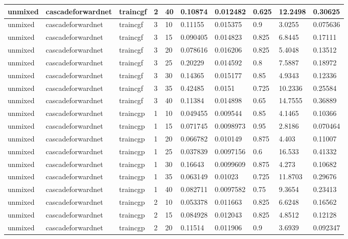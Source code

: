 \begin{longtable}{lllllllll}
unmixed & cascadeforwardnet & traincgf & 2 & 40 & 0.10874 & 0.012482 & 0.625 & 12.2498 & 0.30625 \\ \hline 
unmixed & cascadeforwardnet & traincgf & 3 & 10 & 0.11155 & 0.015375 & 0.9 & 3.0255 & 0.075636 \\ \hline 
unmixed & cascadeforwardnet & traincgf & 3 & 15 & 0.090405 & 0.014823 & 0.825 & 6.8445 & 0.17111 \\ \hline 
unmixed & cascadeforwardnet & traincgf & 3 & 20 & 0.078616 & 0.016206 & 0.825 & 5.4048 & 0.13512 \\ \hline 
unmixed & cascadeforwardnet & traincgf & 3 & 25 & 0.20229 & 0.014592 & 0.8 & 7.5887 & 0.18972 \\ \hline 
unmixed & cascadeforwardnet & traincgf & 3 & 30 & 0.14365 & 0.015177 & 0.85 & 4.9343 & 0.12336 \\ \hline 
unmixed & cascadeforwardnet & traincgf & 3 & 35 & 0.42485 & 0.0151 & 0.725 & 10.2336 & 0.25584 \\ \hline 
unmixed & cascadeforwardnet & traincgf & 3 & 40 & 0.11384 & 0.014898 & 0.65 & 14.7555 & 0.36889 \\ \hline 
unmixed & cascadeforwardnet & traincgp & 1 & 10 & 0.049455 & 0.009544 & 0.85 & 4.1465 & 0.10366 \\ \hline 
unmixed & cascadeforwardnet & traincgp & 1 & 15 & 0.071745 & 0.0098973 & 0.95 & 2.8186 & 0.070464 \\ \hline 
unmixed & cascadeforwardnet & traincgp & 1 & 20 & 0.066782 & 0.010149 & 0.875 & 4.403 & 0.11007 \\ \hline 
unmixed & cascadeforwardnet & traincgp & 1 & 25 & 0.037839 & 0.0097156 & 0.6 & 16.533 & 0.41332 \\ \hline 
unmixed & cascadeforwardnet & traincgp & 1 & 30 & 0.16643 & 0.0099609 & 0.875 & 4.273 & 0.10682 \\ \hline 
unmixed & cascadeforwardnet & traincgp & 1 & 35 & 0.063149 & 0.01023 & 0.725 & 11.8703 & 0.29676 \\ \hline 
unmixed & cascadeforwardnet & traincgp & 1 & 40 & 0.082711 & 0.0097582 & 0.75 & 9.3654 & 0.23413 \\ \hline 
unmixed & cascadeforwardnet & traincgp & 2 & 10 & 0.053378 & 0.011663 & 0.825 & 6.6248 & 0.16562 \\ \hline 
unmixed & cascadeforwardnet & traincgp & 2 & 15 & 0.084928 & 0.012043 & 0.825 & 4.8512 & 0.12128 \\ \hline 
unmixed & cascadeforwardnet & traincgp & 2 & 20 & 0.11514 & 0.011906 & 0.9 & 3.6939 & 0.092347 \\ \hline 

\end{longtable}
